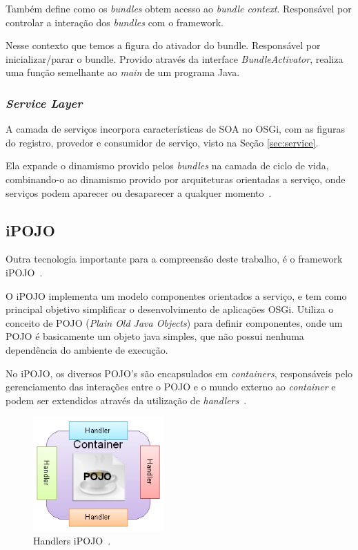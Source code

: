 Também define como os \textit{bundles} obtem acesso ao \textit{bundle context}. Responsável por controlar a interação dos \textit{bundles} com o framework.

Nesse contexto que temos a figura do ativador do bundle. Responsável por inicializar/parar o bundle. Provido através da interface \textit{BundleActivator}, realiza uma função semelhante ao \textit{main} de um programa Java.

\subsubsection{\textit{Service Layer}}
A camada de serviços incorpora características de SOA no OSGi, com as figuras do registro, provedor e consumidor de serviço, visto na Seção \ref{sec:service}. 

Ela expande o dinamismo provido pelos \textit{bundles} na camada de ciclo de vida, combinando-o ao dinamismo provido por arquiteturas orientadas a serviço, onde serviços podem aparecer ou desaparecer a qualquer momento~\cite{hall2010osgi}.

\subsection{iPOJO}
\label{subsec:ipojo}
Outra tecnologia importante para a compreensão deste trabalho, é o framework iPOJO~\cite{ipojo}.

O iPOJO implementa um modelo componentes orientados a serviço, e tem como principal objetivo simplificar o desenvolvimento de aplicações OSGi. Utiliza o conceito de POJO (\textit{Plain Old Java Objects}) para definir componentes, onde um POJO é basicamente um objeto java simples, que não possui nenhuma dependência do ambiente de execução.
	
No iPOJO, os diversos POJO's são encapsulados em \textit{containers}, responsáveis pelo gerenciamento das interações entre o POJO e o mundo externo ao \textit{container} e podem ser extendidos através da utilização de \textit{handlers}~\cite{ipojo}.

\begin{figure}[htp]
\centering
\includegraphics[width=5cm]{chapters/chapter2/ipojo-handlers.png}
\caption[Handlers Ipojo]{Handlers iPOJO~\cite{ipojo}.}
\label{fig:arch_osgi}
\end{figure}

